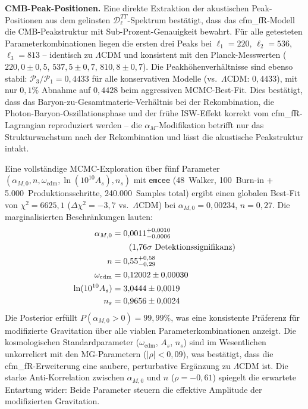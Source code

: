 \documentclass[11pt,a4paper]{article}
\begin{document}
\textbf{CMB-Peak-Positionen.} Eine direkte Extraktion der akustischen Peak-Positionen aus dem gelinsten $\mathcal{D}_\ell^{TT}$-Spektrum best\"atigt, dass das cfm\_fR-Modell die CMB-Peakstruktur mit Sub-Prozent-Genauigkeit bewahrt. F\"ur alle getesteten Parameterkombinationen liegen die ersten drei Peaks bei $\ell_1 = 220$, $\ell_2 = 536$, $\ell_3 = 813$ -- identisch zu $\Lambda$CDM und konsistent mit den Planck-Messwerten ($220{,}0 \pm 0{,}5$, $537{,}5 \pm 0{,}7$, $810{,}8 \pm 0{,}7$). Die Peakh\"ohenverh\"altnisse sind ebenso stabil: $\mathcal{P}_3/\mathcal{P}_1 = 0{,}4433$ f\"ur alle konservativen Modelle (vs.\ $\Lambda$CDM: $0{,}4433$), mit nur $0{,}1\%$ Abnahme auf $0{,}4428$ beim aggressiven MCMC-Best-Fit. Dies best\"atigt, dass das Baryon-zu-Gesamtmaterie-Verh\"altnis bei der Rekombination, die Photon-Baryon-Oszillationsphase und der fr\"uhe ISW-Effekt korrekt vom cfm\_fR-Lagrangian reproduziert werden -- die $\alpha_M$-Modifikation betrifft nur das Strukturwachstum nach der Rekombination und l\"asst die akustische Peakstruktur intakt.

Eine vollst\"andige MCMC-Exploration \"uber f\"unf Parameter $(\alpha_{M,0}, n, \omega_{\mathrm{cdm}}, \ln(10^{10}A_s), n_s)$ mit \texttt{emcee} (48~Walker, 100~Burn-in + 5.000~Produktionsschritte, 240.000~Samples total) ergibt einen globalen Best-Fit von $\chi^2 = 6625{,}1$ ($\Delta\chi^2 = -3{,}7$ vs.\ $\Lambda$CDM) bei $\alpha_{M,0} = 0{,}00234$, $n = 0{,}27$. Die marginalisierten Beschr\"ankungen lauten:
\begin{align}
\alpha_{M,0} &= 0{,}0011^{+0{,}0010}_{-0{,}0006} \notag \\
&\qquad (1{,}76\sigma \text{ Detektionssignifikanz}) \notag \\
n &= 0{,}55^{+0{,}58}_{-0{,}29} \notag \\
\omega_{\mathrm{cdm}} &= 0{,}12002 \pm 0{,}00030 \notag \\
\ln(10^{10}A_s) &= 3{,}0444 \pm 0{,}0019 \notag \\
n_s &= 0{,}9656 \pm 0{,}0024 \notag
\end{align}
Die Posterior erf\"ullt $P(\alpha_{M,0} > 0) = 99{,}99\%$, was eine konsistente Pr\"aferenz f\"ur modifizierte Gravitation \"uber alle viablen Parameterkombinationen anzeigt. Die kosmologischen Standardparameter ($\omega_{\mathrm{cdm}}$, $A_s$, $n_s$) sind im Wesentlichen unkorreliert mit den MG-Parametern ($|\rho| < 0{,}09$), was best\"atigt, dass die cfm\_fR-Erweiterung eine saubere, perturbative Erg\"anzung zu $\Lambda$CDM ist. Die starke Anti-Korrelation zwischen $\alpha_{M,0}$ und $n$ ($\rho = -0{,}61$) spiegelt die erwartete Entartung wider: Beide Parameter steuern die effektive Amplitude der modifizierten Gravitation.
\end{document}
